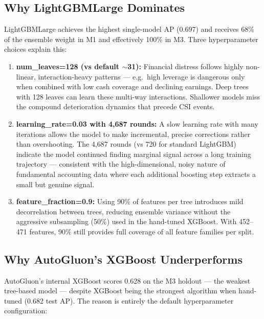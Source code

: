 \documentclass{report}\usepackage[]{graphicx}\usepackage[table]{xcolor}
\begin{document}
\subsection{Why LightGBMLarge Dominates}

LightGBMLarge achieves the highest single-model AP (0.697) and receives 68\% of the
ensemble weight in M1 and effectively 100\% in M3. Three hyperparameter choices explain this:

\begin{enumerate}
    \item \textbf{num\_leaves=128 (vs default $\sim$31):} Financial distress follows
    highly non-linear, interaction-heavy patterns — e.g.\ high leverage is dangerous
    only when combined with low cash coverage and declining earnings. Deep trees with
    128 leaves can learn these multi-way interactions. Shallower models miss the
    compound deterioration dynamics that precede CSI events.

    \item \textbf{learning\_rate=0.03 with 4,687 rounds:} A slow learning rate with
    many iterations allows the model to make incremental, precise corrections rather
    than overshooting. The 4,687 rounds (vs 720 for standard LightGBM) indicate the
    model continued finding marginal signal across a long training trajectory —
    consistent with the high-dimensional, noisy nature of fundamental accounting data
    where each additional boosting step extracts a small but genuine signal.

    \item \textbf{feature\_fraction=0.9:} Using 90\% of features per tree introduces
    mild decorrelation between trees, reducing ensemble variance without the aggressive
    subsampling (50\%) used in the hand-tuned XGBoost. With 452--471 features, 90\%
    still provides full coverage of all feature families per split.
\end{enumerate}

\subsection{Why AutoGluon's XGBoost Underperforms}

AutoGluon's internal XGBoost scores 0.628 on the M3 holdout — the weakest
tree-based model — despite XGBoost being the strongest algorithm when hand-tuned
(0.682 test AP). The reason is entirely the default hyperparameter configuration:
\end{document}
